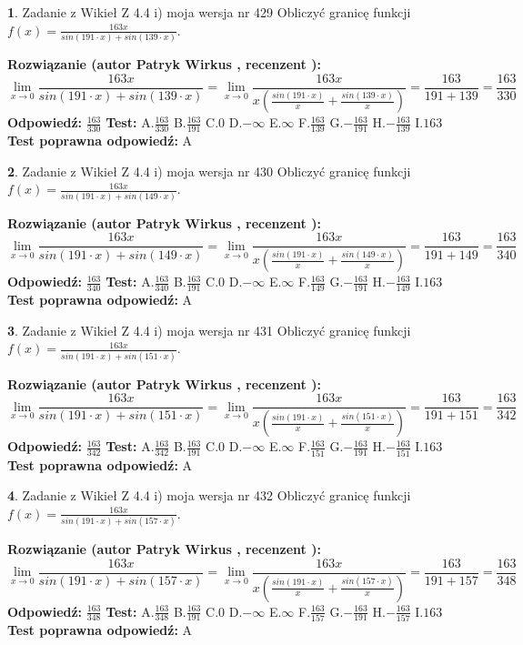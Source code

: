 \documentclass[12pt, a4paper]{article}
\theoremstyle{definition} %
\newtheorem{zad}{}
\newcommand{\zadStart}[1]{\begin{zad}#1\newline}
\newcommand{\zadStop}{\end{zad}}
\newcommand{\rozwStart}[2]{\noindent \textbf{Rozwiązanie (autor #1 , recenzent #2): }\newline}
\newcommand{\rozwStop}{\newline}
\newcommand{\odpStart}{\noindent \textbf{Odpowiedź:}\newline}
\newcommand{\odpStop}{\newline}
\newcommand{\testStart}{\noindent \textbf{Test:}\newline}
\newcommand{\testStop}{\newline}
\newcommand{\kluczStart}{\noindent \textbf{Test poprawna odpowiedź:}\newline}
\newcommand{\kluczStop}{\newline}
\begin{document}
\zadStart{Zadanie z Wikieł Z 4.4 i) moja wersja nr 429}
Obliczyć granicę funkcji $f(x)=\frac{163x}{sin(191\cdot x) +sin(139\cdot x)}$.
\zadStop
\rozwStart{Patryk Wirkus}{}
$$\lim\limits_{x\to 0}\frac{163x}{sin(191\cdot x) +sin(139\cdot x)}=\lim\limits_{x\to 0}\frac{163x}{x(\frac{sin(191\cdot x)}{x}+\frac{sin(139\cdot x)}{x})}=\frac{163}{191+139} = \frac{163}{330}$$
\rozwStop
\odpStart
$\frac{163}{330}$
\odpStop
\testStart
A.$\frac{163}{330}$
B.$\frac{163}{191}$
C.$0$
D.$-\infty$
E.$\infty$
F.$\frac{163}{139}$
G.$-\frac{163}{191}$
H.$-\frac{163}{139}$
I.$163$
\testStop
\kluczStart
A
\kluczStop



\zadStart{Zadanie z Wikieł Z 4.4 i) moja wersja nr 430}
Obliczyć granicę funkcji $f(x)=\frac{163x}{sin(191\cdot x) +sin(149\cdot x)}$.
\zadStop
\rozwStart{Patryk Wirkus}{}
$$\lim\limits_{x\to 0}\frac{163x}{sin(191\cdot x) +sin(149\cdot x)}=\lim\limits_{x\to 0}\frac{163x}{x(\frac{sin(191\cdot x)}{x}+\frac{sin(149\cdot x)}{x})}=\frac{163}{191+149} = \frac{163}{340}$$
\rozwStop
\odpStart
$\frac{163}{340}$
\odpStop
\testStart
A.$\frac{163}{340}$
B.$\frac{163}{191}$
C.$0$
D.$-\infty$
E.$\infty$
F.$\frac{163}{149}$
G.$-\frac{163}{191}$
H.$-\frac{163}{149}$
I.$163$
\testStop
\kluczStart
A
\kluczStop



\zadStart{Zadanie z Wikieł Z 4.4 i) moja wersja nr 431}
Obliczyć granicę funkcji $f(x)=\frac{163x}{sin(191\cdot x) +sin(151\cdot x)}$.
\zadStop
\rozwStart{Patryk Wirkus}{}
$$\lim\limits_{x\to 0}\frac{163x}{sin(191\cdot x) +sin(151\cdot x)}=\lim\limits_{x\to 0}\frac{163x}{x(\frac{sin(191\cdot x)}{x}+\frac{sin(151\cdot x)}{x})}=\frac{163}{191+151} = \frac{163}{342}$$
\rozwStop
\odpStart
$\frac{163}{342}$
\odpStop
\testStart
A.$\frac{163}{342}$
B.$\frac{163}{191}$
C.$0$
D.$-\infty$
E.$\infty$
F.$\frac{163}{151}$
G.$-\frac{163}{191}$
H.$-\frac{163}{151}$
I.$163$
\testStop
\kluczStart
A
\kluczStop



\zadStart{Zadanie z Wikieł Z 4.4 i) moja wersja nr 432}
Obliczyć granicę funkcji $f(x)=\frac{163x}{sin(191\cdot x) +sin(157\cdot x)}$.
\zadStop
\rozwStart{Patryk Wirkus}{}
$$\lim\limits_{x\to 0}\frac{163x}{sin(191\cdot x) +sin(157\cdot x)}=\lim\limits_{x\to 0}\frac{163x}{x(\frac{sin(191\cdot x)}{x}+\frac{sin(157\cdot x)}{x})}=\frac{163}{191+157} = \frac{163}{348}$$
\rozwStop
\odpStart
$\frac{163}{348}$
\odpStop
\testStart
A.$\frac{163}{348}$
B.$\frac{163}{191}$
C.$0$
D.$-\infty$
E.$\infty$
F.$\frac{163}{157}$
G.$-\frac{163}{191}$
H.$-\frac{163}{157}$
I.$163$
\testStop
\kluczStart
A
\kluczStop
\end{document}
